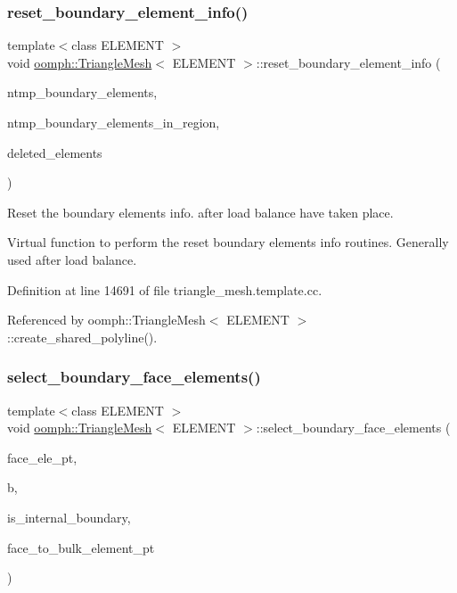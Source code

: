 \subsubsection{\texorpdfstring{reset\+\_\+boundary\+\_\+element\+\_\+info()}{reset\_boundary\_element\_info()}}
{\footnotesize\ttfamily template$<$class E\+L\+E\+M\+E\+NT $>$ \\
void \hyperlink{classoomph_1_1TriangleMesh}{oomph\+::\+Triangle\+Mesh}$<$ E\+L\+E\+M\+E\+NT $>$\+::reset\+\_\+boundary\+\_\+element\+\_\+info (\begin{DoxyParamCaption}\item[{Vector$<$ unsigned $>$ \&}]{ntmp\+\_\+boundary\+\_\+elements,  }\item[{Vector$<$ Vector$<$ unsigned $>$ $>$ \&}]{ntmp\+\_\+boundary\+\_\+elements\+\_\+in\+\_\+region,  }\item[{Vector$<$ Finite\+Element $\ast$$>$ \&}]{deleted\+\_\+elements }\end{DoxyParamCaption})\hspace{0.3cm}{\ttfamily [virtual]}}



Reset the boundary elements info. after load balance have taken place. 

Virtual function to perform the reset boundary elements info routines. Generally used after load balance. 

Definition at line 14691 of file triangle\+\_\+mesh.\+template.\+cc.



Referenced by oomph\+::\+Triangle\+Mesh$<$ E\+L\+E\+M\+E\+N\+T $>$\+::create\+\_\+shared\+\_\+polyline().

\mbox{\label{classoomph_1_1TriangleMesh_ac1f03c55686f172c1680f39895568ac7}} 
\subsubsection{\texorpdfstring{select\+\_\+boundary\+\_\+face\+\_\+elements()}{select\_boundary\_face\_elements()}}
{\footnotesize\ttfamily template$<$class E\+L\+E\+M\+E\+NT $>$ \\
void \hyperlink{classoomph_1_1TriangleMesh}{oomph\+::\+Triangle\+Mesh}$<$ E\+L\+E\+M\+E\+NT $>$\+::select\+\_\+boundary\+\_\+face\+\_\+elements (\begin{DoxyParamCaption}\item[{Vector$<$ Finite\+Element $\ast$$>$ \&}]{face\+\_\+ele\+\_\+pt,  }\item[{const unsigned \&}]{b,  }\item[{bool \&}]{is\+\_\+internal\+\_\+boundary,  }\item[{std\+::map$<$ Finite\+Element $\ast$, Finite\+Element $\ast$$>$ \&}]{face\+\_\+to\+\_\+bulk\+\_\+element\+\_\+pt }\end{DoxyParamCaption})}




